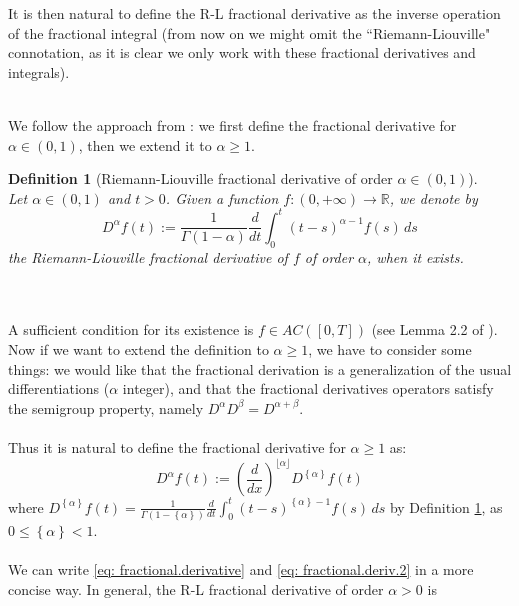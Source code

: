 \documentclass[a4paper,italian,11pt]{book}
\theoremstyle{plain}
\newtheorem{definition}{Definition}
\theoremstyle{remark}
\theoremstyle{plain}
\begin{document}
It is then natural to define the R-L fractional derivative as the inverse operation of the fractional integral (from now on we might omit the ``Riemann-Liouville" connotation, as it is 
clear we only work with these fractional derivatives and integrals).\\\

We follow the approach from \cite{libro19}: we first define the fractional derivative for $\alpha \in (0,1)$, then we extend it to $\alpha \ge 1$.

\begin{definition}[Riemann-Liouville fractional derivative of order $\alpha\in (0,1)$]
\label{definition: riemannliouville deriv}
\\
Let $\alpha \in (0,1)$ and $t>0$. Given a function $f:(0,+\infty) \to \mathbb{R}$, we denote by 
\begin{equation}
    \label{eq: fractional.derivative}
    D^\alpha f(t) := \frac{1}{\Gamma(1-\alpha)} \frac{d}{dt} \int_0^t (t-s)^{\alpha-1}f(s)\,ds
\end{equation}
the Riemann-Liouville fractional derivative of $f$ of order $\alpha$, when it exists. 
\end{definition}
\\
\\
A sufficient condition for its existence is $f\in AC([0,T])$ (see Lemma 2.2 of \cite{libro19}).
\\

Now if we want to extend the definition to $\alpha \ge 1$, we have to consider some things: we would like that the fractional derivation is a generalization of the usual differentiations ($\alpha$ integer), and that the fractional derivatives operators satisfy the semigroup property, namely $D^\alpha D^\beta = D^{\alpha + \beta}$. \\
\\
Thus it is natural to define the fractional derivative for $\alpha \ge 1$ as: 
\begin{equation}
    \label{eq: fractional.deriv.2}
    D^\alpha f(t) := \left(\frac{d}{dx}\right)^{\lfloor \alpha \rfloor} D^{\left\{ \alpha \right\}} f(t)
\end{equation}
where $D^{\left\{ \alpha \right\}} f(t)=  \frac{1}{\Gamma(1-\left\{\alpha\right\})} \frac{d}{dt} \int_0^t (t-s)^{\left\{\alpha\right\}-1}f(s)\,ds$ by Definition \ref{definition: riemannliouville deriv}, as $0\le \left\{ \alpha \right\} <1$.
\\
\\
We can write \eqref{eq: fractional.derivative}  and \eqref{eq: fractional.deriv.2} in a more concise way. In general, the R-L fractional derivative of order $\alpha >0$ is
\end{document}
